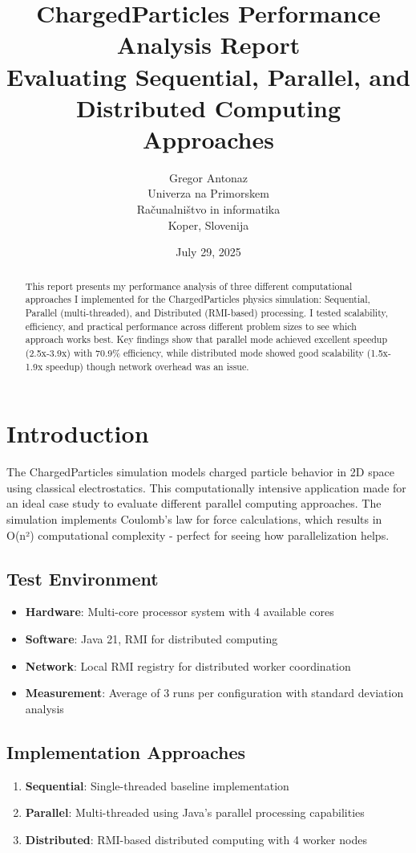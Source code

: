 \documentclass[12pt,a4paper]{article}
\title{ChargedParticles Performance Analysis Report\\
\large Evaluating Sequential, Parallel, and Distributed Computing Approaches}
\author{Gregor Antonaz\\
Univerza na Primorskem\\
Računalništvo in informatika\\
Koper, Slovenija}
\date{July 29, 2025}
\begin{document}
\maketitle

\begin{abstract}
This report presents my performance analysis of three different computational approaches I implemented for the ChargedParticles physics simulation: Sequential, Parallel (multi-threaded), and Distributed (RMI-based) processing. I tested scalability, efficiency, and practical performance across different problem sizes to see which approach works best. Key findings show that parallel mode achieved excellent speedup (2.5x-3.9x) with 70.9\% efficiency, while distributed mode showed good scalability (1.5x-1.9x speedup) though network overhead was an issue.
\end{abstract}

\section{Introduction}

The ChargedParticles simulation models charged particle behavior in 2D space using classical electrostatics. This computationally intensive application made for an ideal case study to evaluate different parallel computing approaches. The simulation implements Coulomb's law for force calculations, which results in O(n²) computational complexity - perfect for seeing how parallelization helps.

\subsection{Test Environment}
\begin{itemize}
    \item \textbf{Hardware}: Multi-core processor system with 4 available cores
    \item \textbf{Software}: Java 21, RMI for distributed computing
    \item \textbf{Network}: Local RMI registry for distributed worker coordination
    \item \textbf{Measurement}: Average of 3 runs per configuration with standard deviation analysis
\end{itemize}

\subsection{Implementation Approaches}
\begin{enumerate}
    \item \textbf{Sequential}: Single-threaded baseline implementation
    \item \textbf{Parallel}: Multi-threaded using Java's parallel processing capabilities
    \item \textbf{Distributed}: RMI-based distributed computing with 4 worker nodes
\end{enumerate}
\end{document}
